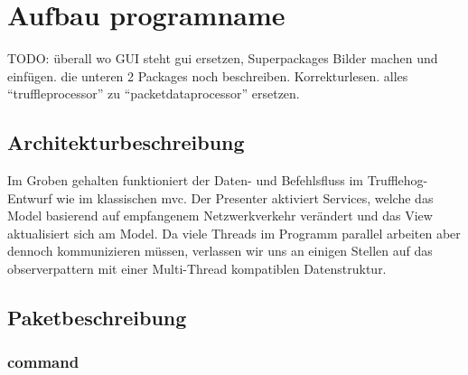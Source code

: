 \chapter{Aufbau \gls{programname}}
                                        TODO: überall wo GUI steht \gls{gui} ersetzen,
                                        Superpackages Bilder machen und einfügen.
                                        die unteren 2 Packages noch beschreiben.
                                        Korrekturlesen.
                                        alles ``truffleprocessor'' zu ``packetdataprocessor'' ersetzen.

\section{Architekturbeschreibung}
Im Groben gehalten funktioniert der Daten- und Befehlsfluss im Trufflehog-Entwurf
wie im klassischen \gls{mvc}. Der Presenter aktiviert Services, welche das Model basierend
auf empfangenem Netzwerkverkehr verändert und das View aktualisiert sich am Model.
Da viele Threads im Programm parallel arbeiten aber dennoch kommunizieren müssen,
verlassen wir uns an einigen Stellen auf das \gls{observerpattern} mit einer
Multi-Thread kompatiblen Datenstruktur.\newline
\newline

\section{Paketbeschreibung}

\subsection{command}
\label{subsec:command}

